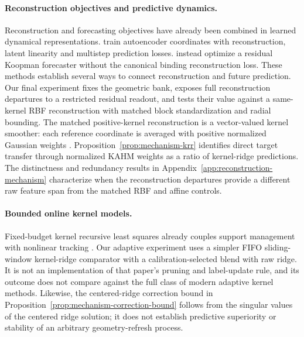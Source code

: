 \paragraph{Reconstruction objectives and predictive dynamics.}
Reconstruction and forecasting objectives have already been combined in
learned dynamical representations. \citet{Lusch2018Embeddings} train
autoencoder coordinates with reconstruction, latent linearity and multistep
prediction losses. \citet{Liu2023Koopa} instead optimize a residual Koopman
forecaster without the canonical binding reconstruction loss. These methods establish several ways to connect reconstruction and
future prediction. Our final experiment fixes the geometric bank, exposes
full reconstruction departures to a restricted residual readout, and tests
their value against a same-kernel RBF reconstruction with matched block
standardization and radial bounding.
The matched positive-kernel reconstruction is a vector-valued kernel
smoother: each reference coordinate is averaged with positive normalized
Gaussian weights \citep{Nadaraya1964Regression}.
Proposition~\ref{prop:mechanism-krr} identifies direct target transfer
through normalized KAHM weights as a ratio of kernel-ridge predictions.
The distinctness and redundancy results in
Appendix~\ref{app:reconstruction-mechanism} characterize when the
reconstruction departures provide a different raw feature span from the
matched RBF and affine controls.

\paragraph{Bounded online kernel models.}
Fixed-budget kernel recursive least squares already couples support
management with nonlinear tracking \citep{VanVaerenbergh2010Budget}.
Our adaptive experiment uses a simpler FIFO
sliding-window kernel-ridge comparator with a calibration-selected blend
with raw ridge. It is not an implementation of that paper's pruning and
label-update rule, and its outcome does not compare against the full class
of modern adaptive kernel methods. Likewise, the centered-ridge correction
bound in Proposition~\ref{prop:mechanism-correction-bound} follows from the singular values of the centered ridge solution; it does not establish predictive superiority or
stability of an arbitrary geometry-refresh process.


